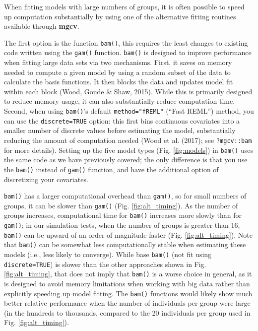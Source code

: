 \documentclass[12pt]{article}
\begin{document}
When fitting models with large numbers of groups, it is often possible
to speed up computation substantially by using one of the alternative
fitting routines available through \textbf{mgcv}.

The first option is the function \texttt{bam()}, this requires the least
changes to existing code written using the \texttt{gam()} function.
\texttt{bam()} is designed to improve performance when fitting large
data sets via two mechanisms. First, it saves on memory needed to
compute a given model by using a random subset of the data to calculate
the basis functions. It then blocks the data and updates model fit
within each block (Wood, Goude \& Shaw, 2015). While this is primarily
designed to reduce memory usage, it can also substantially reduce
computation time. Second, when using \texttt{bam()}'s default
\texttt{method="fREML"} (``Fast REML'') method, you can use the
\texttt{discrete=TRUE} option: this first bins continuous covariates
into a smaller number of discrete values before estimating the model,
substantially reducing the amount of computation needed (Wood et al.
(2017); see \texttt{?mgcv::bam} for more details). Setting up the five
model types (Fig. \ref{fig:models}) in \texttt{bam()} uses the same code
as we have previously covered; the only difference is that you use the
\texttt{bam()} instead of \texttt{gam()} function, and have the
additional option of discretizing your covariates.

\texttt{bam()} has a larger computational overhead than \texttt{gam()},
so for small numbers of groups, it can be slower than \texttt{gam()}
(Fig. \ref{fig:alt_timing}). As the number of groups increases,
computational time for \texttt{bam()} increases more slowly than for
\texttt{gam()}; in our simulation tests, when the number of groups is
greater than 16, \texttt{bam()} can be upward of an order of magnitude
faster (Fig. \ref{fig:alt_timing}). Note that \texttt{bam()} can be
somewhat less computationally stable when estimating these models (i.e.,
less likely to converge). While base \texttt{bam()} (not fit using
\texttt{discrete=TRUE}) is slower than the other approaches shown in
Fig. \ref{fig:alt_timing}, that does not imply that \texttt{bam()} is a
worse choice in general, as it is designed to avoid memory limitations
when working with big data rather than explicitly speeding up model
fitting. The \texttt{bam()} functions would likely show much better
relative performance when the number of individuals per group were large
(in the hundreds to thousands, compared to the 20 individuals per group
used in Fig. \ref{fig:alt_timing}).
\end{document}
